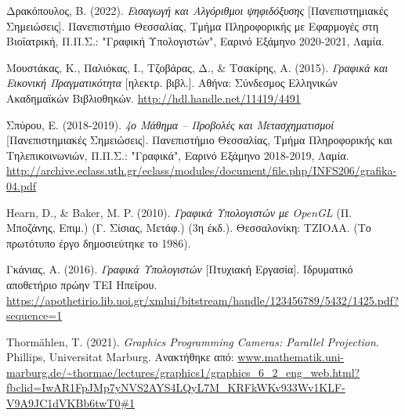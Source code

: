

\begin{thebibliography}{10}


 Δρακόπουλος, Β. (2022). \emph{Εισαγωγή και Αλγόριθμοι ψηφιδόξυσης} [Πανεπιστημιακές Σημειώσεις]. Πανεπιστήμιο Θεσσαλίας, Τμήμα Πληροφορικής με Εφαρμογές στη Βιοϊατρική, Π.Π.Σ.: "Γραφική Υπολογιστών", Εαρινό Εξάμηνο 2020-2021, Λαμία.

 Μουστάκας, Κ., Παλιόκας, Ι., Τζοβάρας, Δ., \& Τσακίρης, Α. (2015). \textit{Γραφικά και Εικονική Πραγματικότητα} [ηλεκτρ. βιβλ.]. Αθήνα: Σύνδεσμος Ελληνικών Ακαδημαϊκών Βιβλιοθηκών. \textlatin{\url{http://hdl.handle.net/11419/4491}}

 Σπύρου, Ε. (2018-2019). \textit{4ο Μάθημα – Προβολές και Μετασχηματισμοί} [Πανεπιστημιακές Σημειώσεις]. Πανεπιστήμιο Θεσσαλίας, Τμήμα Πληροφορικής και Τηλεπικοινωνιών, Π.Π.Σ.: "Γραφικά", Εαρινό Εξάμηνο 2018-2019, Λαμία. 
\textlatin{\url{http://archive.eclass.uth.gr/eclass/modules/document/file.php/INFS206/grafika-04.pdf}}

 \textlatin{Hearn, D., \& Baker, M. P.} (2010). \emph{Γραφικά Υπολογιστών με \textlatin{OpenGL}} (Π. Μποζάνης, Επιμ.) (Γ. Σίσιας, Μετάφ.) (3η έκδ.). Θεσσαλονίκη: ΤΖΙΟΛΑ. (Το πρωτότυπο έργο δημοσιεύτηκε το 1986).

 Γκάνιας, Α. (2016). \textit{Γραφικά Υπολογιστών} [Πτυχιακή Εργασία]. Ιδρυματικό αποθετήριο πρώην ΤΕΙ Ηπείρου. \textlatin{\url{https://apothetirio.lib.uoi.gr/xmlui/bitstream/handle/123456789/5432/1425.pdf?sequence=1}}



 \textlatin{Thormählen, T. (2021). \emph{Graphics Programming Cameras: Parallel Projection}. Phillips, Universitat Marburg}. Ανακτήθηκε από: \textlatin{\url{www.mathematik.uni-marburg.de/~thormae/lectures/graphics1/graphics_6_2_eng_web.html?fbclid=IwAR1FpJMp7yNVS2AYS4LQyL7M_KRFkWKv933Wv1KLF-V9A9JC1dVKBb6twT0#1}}

\end{thebibliography}
